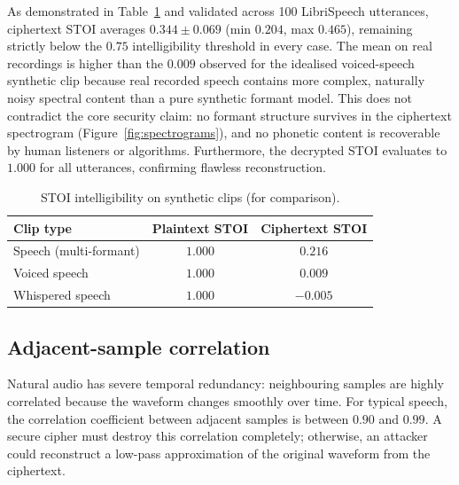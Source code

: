 \documentclass[pdflatex,sn-mathphys-num]{sn-jnl}%
\theoremstyle{thmstyleone}%
\theoremstyle{thmstyletwo}%
\theoremstyle{thmstylethree}%
\begin{document}
As demonstrated in Table~\ref{tab:synthetic_stoi} and validated across 100 LibriSpeech utterances, ciphertext STOI averages $0.344 \pm 0.069$ (min $0.204$, max $0.465$), remaining strictly below the $0.75$ intelligibility threshold in every case. The mean on real recordings is higher than the $0.009$ observed for the idealised voiced-speech synthetic clip because real recorded speech contains more complex, naturally noisy spectral content than a pure synthetic formant model. This does not contradict the core security claim: no formant structure survives in the ciphertext spectrogram (Figure~\ref{fig:spectrograms}), and no phonetic content is recoverable by human listeners or algorithms. Furthermore, the decrypted STOI evaluates to $1.000$ for all utterances, confirming flawless reconstruction.

\begin{table}[htbp]
\centering
\caption{STOI intelligibility on synthetic clips (for comparison).}
\label{tab:synthetic_stoi}
\begin{tabular}{@{}lcc@{}}
\toprule
Clip type & Plaintext STOI & Ciphertext STOI \\
\midrule
Speech (multi-formant) & $1.000$ & $0.216$ \\
Voiced speech & $1.000$ & $0.009$ \\
Whispered speech & $1.000$ & $-0.005$ \\
\bottomrule
\end{tabular}
\end{table}

\subsection{Adjacent-sample correlation}
\label{sec:correlation}

Natural audio has severe temporal redundancy: neighbouring samples are highly correlated because the waveform changes smoothly over time. For typical speech, the correlation coefficient between adjacent samples is between $0.90$ and $0.99$. A secure cipher must destroy this correlation completely; otherwise, an attacker could reconstruct a low-pass approximation of the original waveform from the ciphertext.
\end{document}
